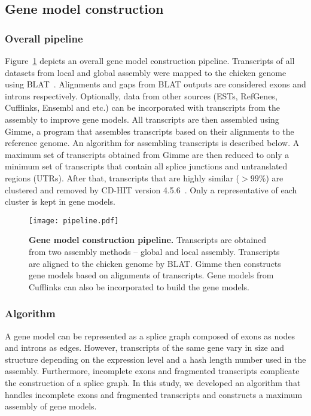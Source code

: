 \subsection{Gene model construction}
\subsubsection{Overall pipeline}

Figure~\ref{pipeline} depicts an overall gene model
construction pipeline.  Transcripts of all datasets from local
and global assembly were mapped to the chicken genome using
BLAT~\cite{Kent:2002tv}.  Alignments and gaps from BLAT outputs
are considered exons and introns respectively.  Optionally, data
from other sources (ESTs, RefGenes, Cufflinks, Ensembl and etc.)
can be incorporated with transcripts from the assembly to improve
gene models.  All transcripts are then assembled using Gimme, a
program that assembles transcripts based on their alignments to
the reference genome.  An algorithm for assembling transcripts is
described below.  A maximum set of transcripts obtained from
Gimme are then reduced to only a minimum set of transcripts that
contain all splice junctions and untranslated regions (UTRs).
After that, transcripts that are highly similar ($>99\%$) are
clustered and removed by CD-HIT version 4.5.6~\cite{Li:2006hr}.
Only a representative of each cluster is kept in gene models.

\begin{figure}[!ht]
\begin{center}
\texttt{[image: pipeline.pdf]}
\end{center}
\caption{
\textbf{Gene model construction pipeline.} Transcripts are obtained from two
assembly methods -- global and local assembly.  Transcripts are aligned to the
chicken genome by BLAT. Gimme then constructs gene models based on alignments
of transcripts. Gene models from Cufflinks can also be
incorporated to build the gene models.}
\label{pipeline}
\end{figure}

\subsubsection{Algorithm}

A gene model can be represented as a splice graph composed of exons as nodes and
introns as edges.  However, transcripts of the same gene vary in size and
structure depending on the expression level and a hash length number used in
the assembly.  Furthermore, incomplete exons and fragmented transcripts complicate
the construction of a splice graph.  In this study, we developed an algorithm
that handles incomplete exons and fragmented transcripts and constructs a
maximum assembly of gene models.

